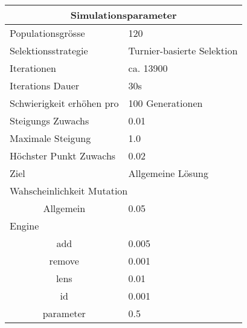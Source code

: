 
    \begin{tabular}{ | l | l | }
      \hline
      \multicolumn{2}{|c|}{Simulationsparameter} \\
      \hline
      Populationsgrösse & 120 \\ \hline
      Selektionsstrategie & Turnier-basierte Selektion \\ \hline
      Iterationen & ca. 13900 \\ \hline
      Iterations Dauer & 30s \\ \hline
      Schwierigkeit erhöhen pro & 100 Generationen \\ \hline
      Steigungs Zuwachs & 0.01 \\ \hline
      Maximale Steigung & 1.0 \\ \hline
      Höchster Punkt Zuwachs & 0.02 \\ \hline
      Ziel & Allgemeine Lösung \\ \hline
      \multicolumn{2}{|l|}{Wahscheinlichkeit Mutation}\\ \hline
      \multicolumn{1}{|c|}{Allgemein} & 0.05 \\ \hline
      Engine &  \\ \hline
      \multicolumn{1}{|c|}{add} & 0.005 \\ \hline
      \multicolumn{1}{|c|}{remove} & 0.001 \\ \hline
      \multicolumn{1}{|c|}{lens} & 0.01 \\ \hline
      \multicolumn{1}{|c|}{id} & 0.001 \\ \hline
      \multicolumn{1}{|c|}{parameter} & 0.5 \\ \hline
    \end{tabular}

